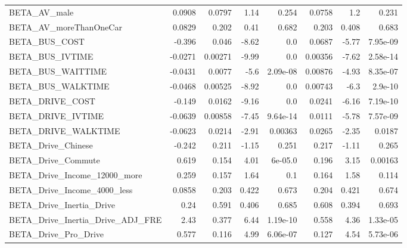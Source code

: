 \begin{tabular}{lrrrrrrr}
BETA\_AV\_male                     &    0.0908 &   0.0797 &      1.14 &    0.254 &        0.0758 &          1.2 &         0.231 \\
BETA\_AV\_moreThanOneCar           &    0.0829 &    0.202 &      0.41 &    0.682 &         0.203 &        0.408 &         0.683 \\
BETA\_BUS\_COST                    &    -0.396 &    0.046 &     -8.62 &      0.0 &        0.0687 &        -5.77 &      7.95e-09 \\
BETA\_BUS\_IVTIME                  &   -0.0271 &  0.00271 &     -9.99 &      0.0 &       0.00356 &        -7.62 &      2.58e-14 \\
BETA\_BUS\_WAITTIME                &   -0.0431 &   0.0077 &      -5.6 & 2.09e-08 &       0.00876 &        -4.93 &      8.35e-07 \\
BETA\_BUS\_WALKTIME                &   -0.0468 &  0.00525 &     -8.92 &      0.0 &       0.00743 &         -6.3 &       2.9e-10 \\
BETA\_DRIVE\_COST                  &    -0.149 &   0.0162 &     -9.16 &      0.0 &        0.0241 &        -6.16 &      7.19e-10 \\
BETA\_DRIVE\_IVTIME                &   -0.0639 &  0.00858 &     -7.45 & 9.64e-14 &        0.0111 &        -5.78 &      7.57e-09 \\
BETA\_DRIVE\_WALKTIME              &   -0.0623 &   0.0214 &     -2.91 &  0.00363 &        0.0265 &        -2.35 &        0.0187 \\
BETA\_Drive\_Chinese               &    -0.242 &    0.211 &     -1.15 &    0.251 &         0.217 &        -1.11 &         0.265 \\
BETA\_Drive\_Commute               &     0.619 &    0.154 &      4.01 &  6e-05.0 &         0.196 &         3.15 &       0.00163 \\
BETA\_Drive\_Income\_12000\_more     &     0.259 &    0.157 &      1.64 &      0.1 &         0.164 &         1.58 &         0.114 \\
BETA\_Drive\_Income\_4000\_less      &    0.0858 &    0.203 &     0.422 &    0.673 &         0.204 &        0.421 &         0.674 \\
BETA\_Drive\_Inertia\_Drive         &      0.24 &    0.591 &     0.406 &    0.685 &         0.608 &        0.394 &         0.693 \\
BETA\_Drive\_Inertia\_Drive\_ADJ\_FRE &      2.43 &    0.377 &      6.44 & 1.19e-10 &         0.558 &         4.36 &      1.33e-05 \\
BETA\_Drive\_Pro\_Drive             &     0.577 &    0.116 &      4.99 & 6.06e-07 &         0.127 &         4.54 &      5.73e-06 \\

\end{tabular}
